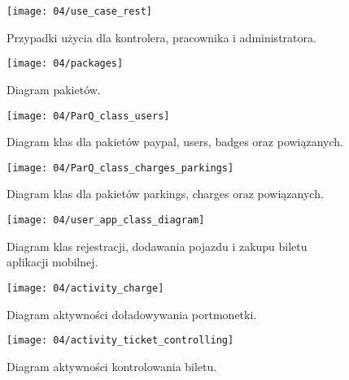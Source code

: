 \begin{figure}[p]
	\begin{center}
		\texttt{[image: 04/use\_case\_rest]}
	\end{center}
	\caption{Przypadki użycia dla kontrolera, pracownika i administratora.}
\end{figure}

\begin{figure}[p]
	\begin{center}
		\texttt{[image: 04/packages]}
	\end{center}
	\caption{Diagram pakietów.}
\end{figure}

\begin{figure}[p]
	\begin{center}
		\texttt{[image: 04/ParQ\_class\_users]}
	\end{center}
	\caption{Diagram klas dla pakietów paypal, users, badges oraz powiązanych.}
\end{figure}

\begin{figure}[p]
	\begin{center}
		\texttt{[image: 04/ParQ\_class\_charges\_parkings]}
	\end{center}
	\caption{Diagram klas dla pakietów parkings, charges oraz powiązanych.}
\end{figure}

\begin{figure}[p]
	\begin{center}
		\texttt{[image: 04/user\_app\_class\_diagram]}
	\end{center}
	\caption{Diagram klas rejestracji, dodawania pojazdu i zakupu biletu aplikacji mobilnej.}
\end{figure}

\begin{figure}[p]
	\begin{center}
		\texttt{[image: 04/activity\_charge]}
	\end{center}
	\caption{Diagram aktywności doładowywania portmonetki.}
\end{figure}

\begin{figure}[p]
	\begin{center}
		\texttt{[image: 04/activity\_ticket\_controlling]}
	\end{center}
	\caption{Diagram aktywności kontrolowania biletu.}
\end{figure}

